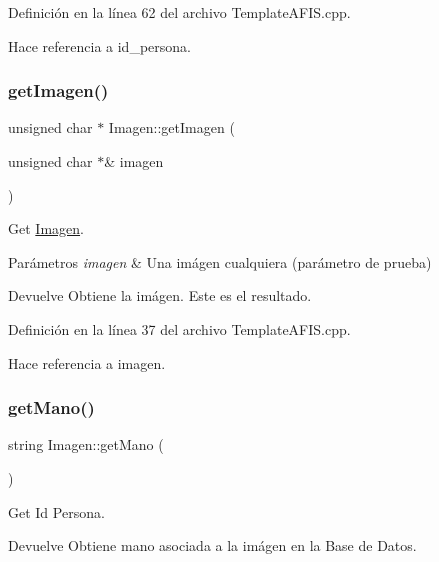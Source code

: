 Definición en la línea 62 del archivo Template\+A\+F\+I\+S.\+cpp.



Hace referencia a id\+\_\+persona.

\hypertarget{classImagen_a676804752c281116609460f738b74924}{}\label{classImagen_a676804752c281116609460f738b74924} 
\subsubsection{\texorpdfstring{get\+Imagen()}{getImagen()}}
{\footnotesize\ttfamily unsigned char $\ast$ Imagen\+::get\+Imagen (\begin{DoxyParamCaption}\item[{unsigned char $\ast$\&}]{imagen }\end{DoxyParamCaption})}



Get \hyperlink{classImagen}{Imagen}. 


\begin{DoxyParams}{Parámetros}
{\em imagen} & Una imágen cualquiera (parámetro de prueba) \\
\hline
\end{DoxyParams}
\begin{DoxyReturn}{Devuelve}
Obtiene la imágen. Este es el resultado. 
\end{DoxyReturn}


Definición en la línea 37 del archivo Template\+A\+F\+I\+S.\+cpp.



Hace referencia a imagen.

\hypertarget{classImagen_a687160f46f2e80fee30dac0955268c39}{}\label{classImagen_a687160f46f2e80fee30dac0955268c39} 
\subsubsection{\texorpdfstring{get\+Mano()}{getMano()}}
{\footnotesize\ttfamily string Imagen\+::get\+Mano (\begin{DoxyParamCaption}{ }\end{DoxyParamCaption})}



Get Id Persona. 

\begin{DoxyReturn}{Devuelve}
Obtiene mano asociada a la imágen en la Base de Datos. 
\end{DoxyReturn}


